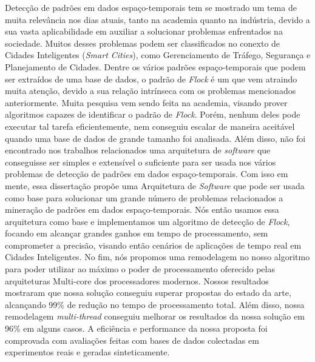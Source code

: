 Detecção de padrões em dados espaço-temporais tem se mostrado um tema de muita relevância nos dias atuais, tanto na
academia quanto na indústria, devido a sua vasta aplicabilidade em auxiliar a solucionar problemas enfrentados na
sociedade. Muitos desses problemas podem ser classificados no conexto de Cidades Inteligentes (\textit{Smart Cities}),
como Gerenciamento de Tráfego, Segurança e Planejamento de Cidades. Dentre os vários padrões espaço-temporais que podem
ser extraídos de uma base de dados, o padrão de \textit{Flock} é um que vem atraindo muita atenção, devido a sua relação
intrínseca com os problemas mencionados anteriormente. Muita pesquisa vem sendo feita na academia, visando prover
algoritmos capazes de identificar o padrão de \textit{Flock}. Porém, nenhum deles pode executar tal tarefa
eficientemente, nem conseguiu escalar de maneira aceitável quando uma base de dados de grande tamanho foi analisada.
Além disso, não foi encontrado nos trabalhos relacionados uma arquitetura de \textit{software} que conseguisse ser
simples e extensível o suficiente para ser usada nos vários problemas de detecção de padrões em dados espaço-temporais.
Com isso em mente, essa dissertação propõe uma Arquitetura de \textit{Software} que pode ser usada como base para
solucionar um grande número de problemas relacionados a mineração de padrões em dados espaço-temporais. Nós então usamos
essa arquitetura como base e implementamos um algoritmo de detecção de \textit{Flock}, focando em alcançar grandes
ganhos em tempo de processamento, sem comprometer a precisão, visando então cenários de aplicações de tempo real em
Cidades Inteligentes. No fim, nós propomos uma remodelagem no nosso algoritmo para poder utilizar ao máximo o poder de
processamento oferecido pelas arquiteturas Multi-core dos processadores modernos. Nossos resultados mostraram que nossa
solução conseguiu superar propostas do estado da arte, alcançando 99\% de redução no tempo de processamento total. Além
disso, nossa remodelagem \textit{multi-thread} conseguiu melhorar os resultados da nossa solução em 96\% em alguns
casos. A eficiência e performance da nossa proposta foi comprovada com avaliações feitas com bases de dados colectadas
em experimentos reais e geradas sinteticamente.
